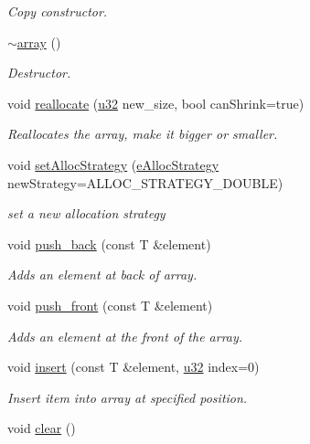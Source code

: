 \begin{DoxyCompactItemize}
\begin{DoxyCompactList}\small\item\em Copy constructor. \end{DoxyCompactList}\item 
\hyperlink{classirr_1_1core_1_1array_aac1853f45d4c18feaacac9859efe9836}{$\sim$array} ()
\begin{DoxyCompactList}\small\item\em Destructor. \end{DoxyCompactList}\item 
void \hyperlink{classirr_1_1core_1_1array_ada5735f409eca82b9031d993ee8b31c3}{reallocate} (\hyperlink{namespaceirr_a0416a53257075833e7002efd0a18e804}{u32} new\+\_\+size, bool can\+Shrink=true)
\begin{DoxyCompactList}\small\item\em Reallocates the array, make it bigger or smaller. \end{DoxyCompactList}\item 
void \hyperlink{classirr_1_1core_1_1array_a7aef3e5dbf91f8d1e8f365039e2497ae}{set\+Alloc\+Strategy} (\hyperlink{namespaceirr_1_1core_aa2e91971d5e6e84de235bfabe3c7adba}{e\+Alloc\+Strategy} new\+Strategy=A\+L\+L\+O\+C\+\_\+\+S\+T\+R\+A\+T\+E\+G\+Y\+\_\+\+D\+O\+U\+B\+LE)
\begin{DoxyCompactList}\small\item\em set a new allocation strategy \end{DoxyCompactList}\item 
void \hyperlink{classirr_1_1core_1_1array_ad2c9dff8592b95c25c59f5383fc633fe}{push\+\_\+back} (const T \&element)
\begin{DoxyCompactList}\small\item\em Adds an element at back of array. \end{DoxyCompactList}\item 
void \hyperlink{classirr_1_1core_1_1array_a31b686ce4b1ebae930f22bc40d30efbd}{push\+\_\+front} (const T \&element)
\begin{DoxyCompactList}\small\item\em Adds an element at the front of the array. \end{DoxyCompactList}\item 
void \hyperlink{classirr_1_1core_1_1array_a3b0f73c95dd449a4de576c6b1943566c}{insert} (const T \&element, \hyperlink{namespaceirr_a0416a53257075833e7002efd0a18e804}{u32} index=0)
\begin{DoxyCompactList}\small\item\em Insert item into array at specified position. \end{DoxyCompactList}\item 
void \hyperlink{classirr_1_1core_1_1array_a236e08ca44ddf3c2b47b726f90db8d39}{clear} ()\hypertarget{classirr_1_1core_1_1array_a236e08ca44ddf3c2b47b726f90db8d39}{}\label{classirr_1_1core_1_1array_a236e08ca44ddf3c2b47b726f90db8d39}


\end{DoxyCompactItemize}
